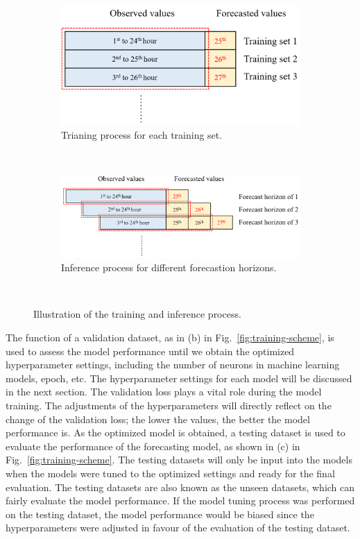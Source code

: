 \begin{figure}[!ht]
  \centering
  \begin{subfigure}[t]{0.65\textwidth}
    \includegraphics[width=\linewidth]{imgs/revision/train-forecast-horizon.png}
    \caption{Trianing process for each training set.} \label{fig:train-process}
  \end{subfigure}\\
  \vspace{1em}
  \begin{subfigure}[t]{0.9\textwidth}
    \includegraphics[width=\linewidth]{imgs/revision/inference-forecast-horizon.png}
    \caption{Inference process for different forecastion horizons.} \label{fig:inference-process}
  \end{subfigure}\\
\caption{Illustration of the training and inference process.} \label{fig:forecast-horizon}
\end{figure}

The function of a validation dataset, as in (b) in Fig.~\ref{fig:training-scheme}, is used to assess the model performance until we obtain the optimized hyperparameter settings, including the number of neurons in machine learning models, epoch, etc. The hyperparameter settings for each model will be discussed in the next section. The validation loss plays a vital role during the model training. The adjustments of the hyperparameters will directly reflect on the change of the validation loss; the lower the values, the better the model performance is. As the optimized model is obtained, a testing dataset is used to evaluate the performance of the forecasting model, as shown in (c) in Fig.~\ref{fig:training-scheme}. The testing datasets will only be input into the models when the models were tuned to the optimized settings and ready for the final evaluation. The testing datasets are also known as the unseen datasets, which can fairly evaluate the model performance. If the model tuning process was performed on the testing dataset, the model performance would be biased since the hyperparameters were adjusted in favour of the evaluation of the testing dataset.

